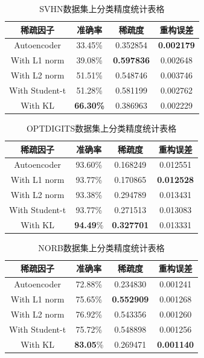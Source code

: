\documentclass[oneside]{ZJUthesis}
\begin{document}
\begin{table}[h]
\begin{center}
{
\caption{SVHN数据集上分类精度统计表格}\label{result_svhn}}
\begin{tabular}{|c|c|c|c|}
\hline
稀疏因子 & 准确率 & 稀疏度 & 重构误差 \\
\hline
Autoencoder    & 33.45\% & 0.352854 & \textbf{0.002179} \\
\hline
With L1 norm   & 39.08\% & \textbf{0.597836} & 0.002648 \\
\hline
With L2 norm   & 51.51\% & 0.548746 & 0.003746 \\
\hline
With Student-t & 51.28\% & 0.581199 & 0.002762 \\
\hline
With KL        & \textbf{66.30\%} & 0.386963 & 0.002229\\
\hline
\end{tabular}
\end{center}
\end{table}

\begin{table}[h]
\begin{center}
{
\caption{OPTDIGITS数据集上分类精度统计表格 }\label{result_optdigits}}
\begin{tabular}{|c|c|c|c|}
\hline
稀疏因子 & 准确率 & 稀疏度 & 重构误差 \\
\hline
Autoencoder    & 93.60\%  & 0.168249 & 0.012551 \\
\hline
With L1 norm   & 93.77\%  & 0.170865 & \textbf{0.012528} \\
\hline
With L2 norm   & 93.38\%  & 0.294789 & 0.013431\\
\hline
With Student-t & 93.77\%  & 0.271513 & 0.013083 \\
\hline
With KL        & \textbf{94.49}\%  & \textbf{0.327701} & 0.013331 \\
\hline
\end{tabular}
\end{center}
\end{table}

\begin{table}[h]
\begin{center}
{
\caption{NORB数据集上分类精度统计表格}\label{result_norb}}
\begin{tabular}{|c|c|c|c|}
\hline
稀疏因子 & 准确率 & 稀疏度 & 重构误差 \\
\hline
Autoencoder    & 72.88\%  & 0.234830 & 0.001241 \\
\hline
With L1 norm   & 75.65\%  & \textbf{0.552909} & 0.001268 \\
\hline
With L2 norm   & 76.92\%  & 0.543356 & 0.001260 \\
\hline
With Student-t & 75.72\% & 0.548898 & 0.001256 \\
\hline
With KL        & \textbf{83.05}\%  & 0.269471 & \textbf{0.001140} \\
\hline
\end{tabular}
\end{center}
\end{table}
\end{document}
